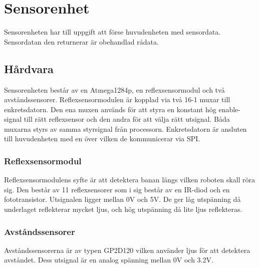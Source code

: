 
\section{Sensorenhet}

Sensorenheten har till uppgift att förse huvudenheten med sensordata. Sensordatan den returnerar är obehandlad rådata.

\subsection{Hårdvara}


Sensorenheten består av en Atmega1284p, en reflexsensormodul och två avståndssensorer. Reflexsensormodulen är kopplad via två 16-1 muxar till enkretsdatorn. Den ena muxen används för att styra en konstant hög enable-signal till rätt reflexsensor och den andra för att välja rätt utsignal. Båda muxarna styrs av samma styrsignal från processorn. Enkretsdatorn är ansluten till huvudenheten med en  över vilken de kommunicerar via SPI.


\subsubsection{Reflexsensormodul}

Reflexsensormodulens syfte är att detektera banan längs vilken roboten skall röra sig. Den består av 11 reflexsensorer som i sig består av en IR-diod och en fototransistor. Utsignalen ligger mellan 0V och 5V. De ger låg utspänning då underlaget reflekterar mycket ljus, och hög utspänning då lite ljus reflekteras.

\subsubsection{Avståndssensorer}

Avståndssensorerna är av typen GP2D120 vilken använder ljus för att detektera avståndet. Dess utsignal är en analog spänning mellan 0V och 3.2V.

